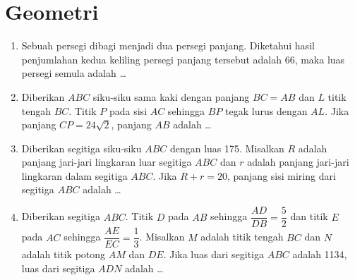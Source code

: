 \documentclass[12pt]{scrartcl}
\begin{document}
\section{Geometri}
\begin{enumerate}[resume]
	\item Sebuah persegi dibagi menjadi dua persegi panjang. Diketahui hasil penjumlahan kedua
	keliling persegi panjang tersebut adalah 66, maka luas persegi semula adalah \dots

	\item Diberikan $ABC$ siku-siku sama kaki dengan panjang $BC=AB$ dan $L$ titik tengah $BC$.
	Titik $P$ pada sisi $AC$ sehingga $BP$ tegak lurus dengan $AL$.
	Jika panjang $CP=24\sqrt{2}$, panjang $AB$ adalah \dots

	\item Diberikan segitiga siku-siku $ABC$ dengan luas 175. Misalkan $R$ adalah panjang jari-jari
	lingkaran luar segitiga $ABC$ dan $r$ adalah panjang jari-jari lingkaran dalam segitiga $ABC$.
	Jika $R+r=20$, panjang sisi miring dari segitiga $ABC$ adalah \dots

	\item Diberikan segitiga $ABC$. Titik $D$ pada $AB$ sehingga $\dfrac{AD}{DB}=\dfrac{5}{2}$ dan
	titik $E$ pada $AC$ sehingga $\dfrac{AE}{EC}=\dfrac{1}{3}$. Misalkan $M$ adalah titik tengah $BC$
	dan $N$ adalah titik potong $AM$ dan $DE$. Jika luas dari segitiga $ABC$ adalah 1134,
	luas dari segitiga $ADN$ adalah \dots
\end{enumerate}

\newpage
\end{document}
